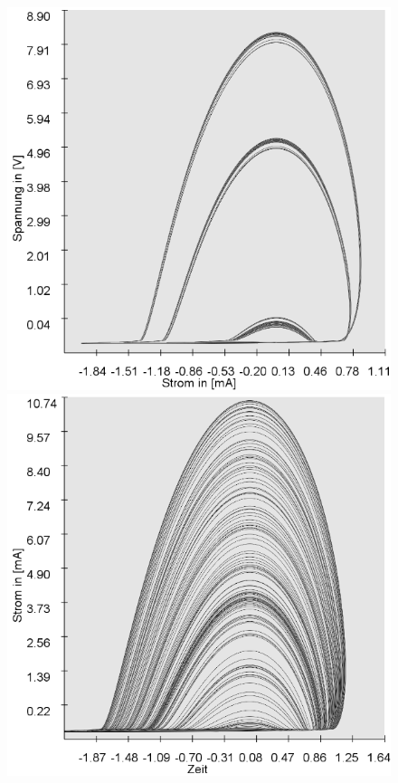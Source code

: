 \documentclass{scrartcl}
\begin{document}
\begin{figure}
\includegraphics[scale=0.28]{V_s-4V}
\includegraphics[scale=0.28]{V_s-6V}

\end{figure}
\end{document}
